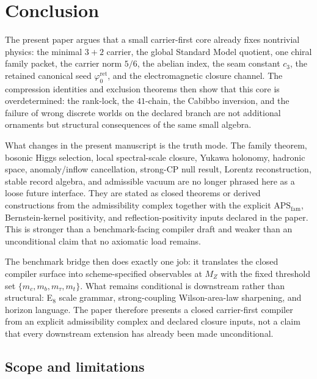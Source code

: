 \documentclass[11pt,a4paper]{article}
\theoremstyle{definition}
\theoremstyle{remark}
\newcommand{\cthree}{c_3}
\newcommand{\phiz}{\varphi_0^{\mathrm{ret}}}
\newcommand{\APSfam}{\mathrm{APS}_{\mathrm{fam}}}
\begin{document}
\section{Conclusion}

The present paper argues that a small carrier-first core already fixes nontrivial physics: the minimal $3+2$ carrier, the global Standard Model quotient, one chiral family packet, the carrier norm $5/6$, the abelian index, the seam constant $\cthree$, the retained canonical seed $\phiz$, and the electromagnetic closure channel. The compression identities and exclusion theorems then show that this core is overdetermined: the rank-lock, the $41$-chain, the Cabibbo inversion, and the failure of wrong discrete worlds on the declared branch are not additional ornaments but structural consequences of the same small algebra.

What changes in the present manuscript is the truth mode. The family theorem, bosonic Higgs selection, local spectral-scale closure, Yukawa holonomy, hadronic space, anomaly/inflow cancellation, strong-CP null result, Lorentz reconstruction, stable record algebra, and admissible vacuum are no longer phrased here as a loose future interface. They are stated as closed theorems or derived constructions from the admissibility complex together with the explicit $\APSfam$, Bernstein-kernel positivity, and reflection-positivity inputs declared in the paper. This is stronger than a benchmark-facing compiler draft and weaker than an unconditional claim that no axiomatic load remains.

The benchmark bridge then does exactly one job: it translates the closed compiler surface into scheme-specified observables at $M_Z$ with the fixed threshold set $\{m_c,m_b,m_\tau,m_t\}$. What remains conditional is downstream rather than structural: E$_8$ scale grammar, strong-coupling Wilson-area-law sharpening, and horizon language. The paper therefore presents a closed carrier-first compiler from an explicit admissibility complex and declared closure inputs, not a claim that every downstream extension has already been made unconditional.

\subsection{Scope and limitations}
\end{document}
